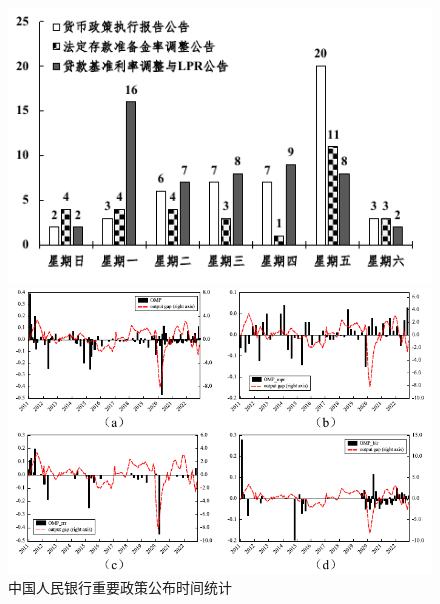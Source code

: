 \documentclass[12pt,aspectratio=169]{ctexbeamer}
\begin{document}
			\begin{frame}
				\frametitle{}
				\begin{figure}
					\begin{minipage}{0.25\textwidth}
						\centering
						\includegraphics[width=\linewidth]{figures/fig.5-1}
						\caption{中国人民银行重要政策公布时间统计}
						\label{mp}
					\end{minipage}
					\hfill
					\begin{minipage}{0.45\textwidth}
						\centering
						\includegraphics[width=\linewidth]{figures/fig.5-2}	

\end{minipage}
\end{figure}
\end{frame}
\end{document}
